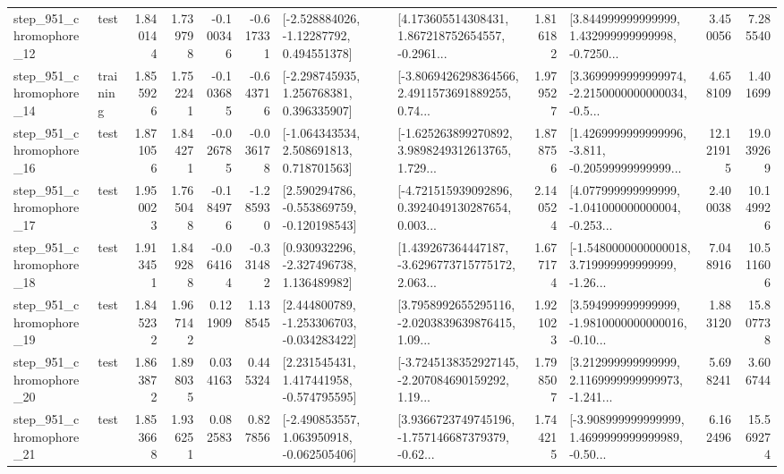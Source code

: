 \begin{tabular}{llrrrrllrlrr}
  step\_951\_chromophore\_12 &      test &      1.840144 &    1.739798 &     -0.100346 & -0.617331 &    [-2.528884026, -1.12287792, 0.494551378] &  [4.173605514308431, 1.867218752654557, -0.2961... &       1.816182 &  [3.844999999999999, 1.432999999999998, -0.7250... &            3.450056 &          7.285540 \\
  step\_951\_chromophore\_14 &  training &      1.855926 &    1.752241 &     -0.103685 & -0.643716 &    [-2.298745935, 1.256768381, 0.396335907] &  [-3.8069426298364566, 2.4911573691889255, 0.74... &       1.979527 &  [3.3699999999999974, -2.2150000000000034, -0.5... &            4.658109 &          1.401699 \\
  step\_951\_chromophore\_16 &      test &      1.871056 &    1.844271 &     -0.026785 & -0.036178 &    [-1.064343534, 2.508691813, 0.718701563] &  [-1.625263899270892, 3.9898249312613765, 1.729... &       1.878756 &  [1.4269999999999996, -3.811, -0.20599999999999... &           12.121915 &         19.039269 \\
  step\_951\_chromophore\_17 &      test &      1.950023 &    1.765048 &     -0.184976 & -1.285930 &   [2.590294786, -0.553869759, -0.120198543] &  [-4.721515939092896, 0.3924049130287654, 0.003... &       2.140524 &  [4.077999999999999, -1.041000000000004, -0.253... &            2.400038 &         10.149926 \\
  step\_951\_chromophore\_18 &      test &      1.913451 &    1.849288 &     -0.064164 & -0.331482 &    [0.930932296, -2.327496738, 1.136489982] &  [1.439267364447187, -3.6296773715775172, 2.063... &       1.677174 &  [-1.5480000000000018, 3.719999999999999, -1.26... &            7.048916 &         10.511606 \\
  step\_951\_chromophore\_19 &      test &      1.845232 &    1.967142 &      0.121909 &  1.138545 &   [2.444800789, -1.253306703, -0.034283422] &  [3.7958992655295116, -2.0203839639876415, 1.09... &       1.921023 &  [3.594999999999999, -1.9810000000000016, -0.10... &            1.883120 &         15.807738 \\
  step\_951\_chromophore\_20 &      test &      1.863872 &    1.898035 &      0.034163 &  0.445324 &    [2.231545431, 1.417441958, -0.574795595] &  [-3.7245138352927145, -2.207084690159292, 1.19... &       1.798507 &  [3.212999999999999, 2.1169999999999973, -1.241... &            5.698241 &          3.606744 \\
  step\_951\_chromophore\_21 &      test &      1.853668 &    1.936251 &      0.082583 &  0.827856 &   [-2.490853557, 1.063950918, -0.062505406] &  [3.9366723749745196, -1.757146687379379, -0.62... &       1.744215 &  [-3.908999999999999, 1.4699999999999989, -0.50... &            6.162496 &         15.569274 \\

\end{tabular}
